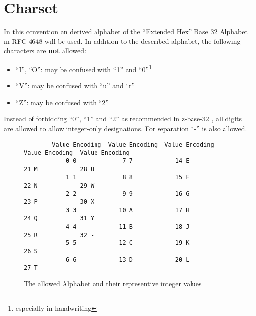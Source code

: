 %
%
%
%
%
%
%

\section{Charset}

In this convention an derived alphabet of the ``Extended Hex'' Base 32 Alphabet
in RFC 4648 \cite{RFC-4648} will be used. In addition to the described alphabet,
the following characters are \textbf{\underline{not}} allowed:

\begin{itemize}
	\itemsep 0pt

	\item ``I'', ``O'': may be confused with ``1'' and ``0''\footnote{\label{foot:handwriting}especially in handwriting}
	\item ``V'': may be confused with ``u'' and ``r''
	\item ``Z'': may be confused with ``2''
\end{itemize}

Instead of forbidding ``0'', ``1'' and ``2'' as recommended in z-base-32
\cite{z-base-32}, all digits are allowed to allow integer-only designations.
For separation ``-'' is also allowed.


\begin{figure}[H]
	\label{fig:charset}

	\begin{verbatim}
		Value Encoding  Value Encoding  Value Encoding  Value Encoding  Value Encoding
		    0 0             7 7            14 E            21 M            28 U
		    1 1             8 8            15 F            22 N            29 W
		    2 2             9 9            16 G            23 P            30 X
		    3 3            10 A            17 H            24 Q            31 Y
		    4 4            11 B            18 J            25 R            32 -
		    5 5            12 C            19 K            26 S
		    6 6            13 D            20 L            27 T
	\end{verbatim}

	\caption{The allowed Alphabet and their representive integer values}
\end{figure}


